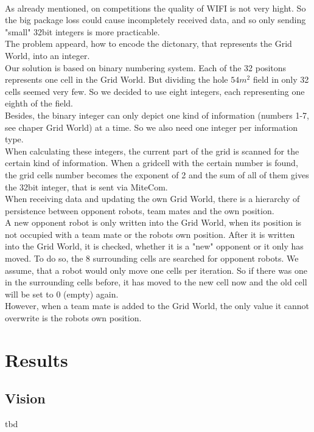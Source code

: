 \documentclass[lnicst,a4paper]{svmultln}
\begin{document}
\\
As already mentioned, on competitions the quality of WIFI is not very hight. So the big package loss could cause incompletely received data, and so only sending "small" 32bit integers is more practicable. 
\\
The problem appeard, how to encode the dictonary, that represents the Grid World, into an integer.
\\
Our solution is based on binary numbering system. Each of the 32 positons represents one cell in the Grid World. But dividing the hole $54m^2$ field in only 32 cells seemed very few. So we decided to use eight integers, each representing one eighth of the field.
\\
Besides, the binary integer can only depict one kind of information (numbers 1-7, see chaper Grid World) at a time. So we also need one integer per information type.
\\
When calculating these integers, the current part of the grid is scanned for the certain kind of information. When a gridcell with the certain number is found, the grid cells number becomes the exponent of 2 and the sum of all of them gives the 32bit integer, that is sent via MiteCom.
\\
When receiving data and updating the own Grid World, there is a hierarchy of persistence between opponent robots, team mates and the own position. 
\\
A new opponent robot is only written into the Grid World, when its position is not occupied with a team mate or the robots own position. After it is written into the Grid World, it is checked, whether it is a "new" opponent or it only has moved. To do so, the 8 surrounding cells are searched for opponent robots. We assume, that a robot would only move one cells per iteration. So if there was one in the surrounding cells before, it has moved to the new cell now and the old cell will be set to 0 (empty) again.
\\
However, when a team mate is added to the Grid World, the only value it cannot overwrite is the robots own position.


\section{Results}

\subsection{Vision}
tbd
\end{document}

